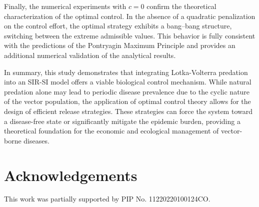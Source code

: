 \documentclass{amsart}
\theoremstyle{definition}
\theoremstyle{remark}
\numberwithin{equation}{section}
\begin{document}
Finally, the numerical experiments with $c=0$ confirm the theoretical characterization of the optimal control.
In the absence of a quadratic penalization on the control effort, the optimal strategy exhibits a bang--bang structure, switching between the extreme admissible values.
This behavior is fully consistent with the predictions of the Pontryagin Maximum Principle and provides an additional numerical validation of the analytical results.

 
 In summary, this study demonstrates that integrating Lotka-Volterra predation into an SIR-SI model offers a viable biological control mechanism. While natural predation alone may lead to periodic disease prevalence due to the cyclic nature of the vector population, the application of optimal control theory allows for the design of efficient release strategies. These strategies can force the system toward a disease-free state or significantly mitigate the epidemic burden, providing a theoretical foundation for the economic and ecological management of vector-borne diseases.
 
\section*{Acknowledgements}
This work was partially supported by PIP No. 11220220100124CO.




			
				
				
				
\end{document}
